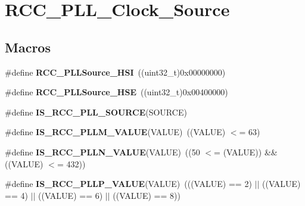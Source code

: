 \hypertarget{group___r_c_c___p_l_l___clock___source}{}\section{R\+C\+C\+\_\+\+P\+L\+L\+\_\+\+Clock\+\_\+\+Source}
\label{group___r_c_c___p_l_l___clock___source}
\subsection*{Macros}
\begin{DoxyCompactItemize}
\item 
\mbox{\label{group___r_c_c___p_l_l___clock___source_ga1cbb1ae8d9e282a763a0070b251921f9}} 
\#define {\bfseries R\+C\+C\+\_\+\+P\+L\+L\+Source\+\_\+\+H\+SI}~((uint32\+\_\+t)0x00000000)
\item 
\mbox{\label{group___r_c_c___p_l_l___clock___source_ga3706d0db7fe1836c65dc2ea7deded721}} 
\#define {\bfseries R\+C\+C\+\_\+\+P\+L\+L\+Source\+\_\+\+H\+SE}~((uint32\+\_\+t)0x00400000)
\item 
\#define {\bfseries I\+S\+\_\+\+R\+C\+C\+\_\+\+P\+L\+L\+\_\+\+S\+O\+U\+R\+CE}(S\+O\+U\+R\+CE)
\item 
\mbox{\label{group___r_c_c___p_l_l___clock___source_ga8db327c085e20aeb673a9784f8508597}} 
\#define {\bfseries I\+S\+\_\+\+R\+C\+C\+\_\+\+P\+L\+L\+M\+\_\+\+V\+A\+L\+UE}(V\+A\+L\+UE)~((V\+A\+L\+UE) $<$= 63)
\item 
\mbox{\label{group___r_c_c___p_l_l___clock___source_ga12835741fbedd278ad1e91abebe00837}} 
\#define {\bfseries I\+S\+\_\+\+R\+C\+C\+\_\+\+P\+L\+L\+N\+\_\+\+V\+A\+L\+UE}(V\+A\+L\+UE)~((50 $<$= (V\+A\+L\+UE)) \&\& ((V\+A\+L\+UE) $<$= 432))
\item 
\mbox{\label{group___r_c_c___p_l_l___clock___source_gad808f83505f4e802e5bafab7831f0235}} 
\#define {\bfseries I\+S\+\_\+\+R\+C\+C\+\_\+\+P\+L\+L\+P\+\_\+\+V\+A\+L\+UE}(V\+A\+L\+UE)~(((V\+A\+L\+UE) == 2) $\vert$$\vert$ ((V\+A\+L\+UE) == 4) $\vert$$\vert$ ((V\+A\+L\+UE) == 6) $\vert$$\vert$ ((V\+A\+L\+UE) == 8))
$$
\end{DoxyCompactItemize}
